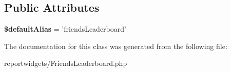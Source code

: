 \subsection*{Public Attributes}
\begin{DoxyCompactItemize}
\item 
\hypertarget{classDMA_1_1Friends_1_1ReportWidgets_1_1FriendsLeaderboard_ab1f836744d59c96df00f1fad2cddb01f}{{\bfseries \$default\+Alias} = 'friends\+Leaderboard'}\label{classDMA_1_1Friends_1_1ReportWidgets_1_1FriendsLeaderboard_ab1f836744d59c96df00f1fad2cddb01f}

\end{DoxyCompactItemize}


The documentation for this class was generated from the following file\+:\begin{DoxyCompactItemize}
\item 
reportwidgets/Friends\+Leaderboard.\+php\end{DoxyCompactItemize}
